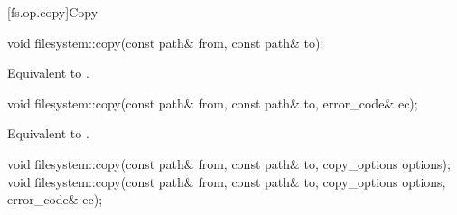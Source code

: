 [fs.op.copy]{Copy}

%
\begin{itemdecl}
void filesystem::copy(const path& from, const path& to);
\end{itemdecl}

\begin{itemdescr}
\pnum
\effects
Equivalent to
.
\end{itemdescr}

%
\begin{itemdecl}
void filesystem::copy(const path& from, const path& to, error_code& ec);
\end{itemdecl}

\begin{itemdescr}
\pnum
\effects
Equivalent to
.
\end{itemdescr}

%
\begin{itemdecl}
void filesystem::copy(const path& from, const path& to, copy_options options);
void filesystem::copy(const path& from, const path& to, copy_options options,
                      error_code& ec);
\end{itemdecl}

